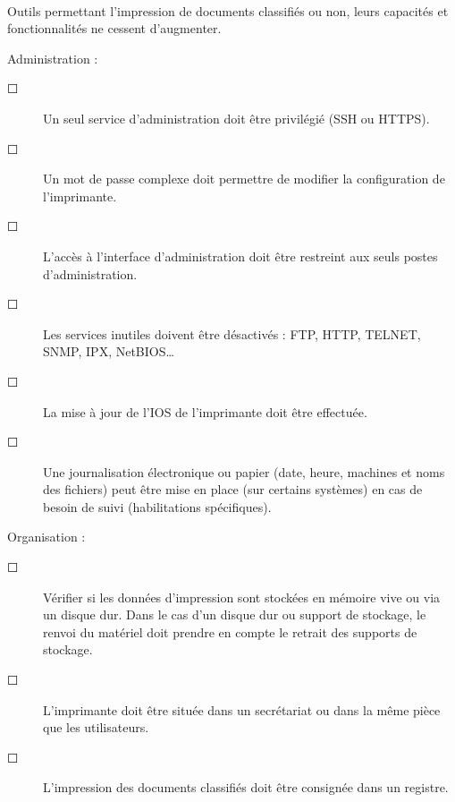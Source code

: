 \documentclass[a4paper,11pt]{article}				    %
\begin{document}
{
\\Outils permettant l'impression de documents classifi\'es ou non, leurs capacit\'es et fonctionnalit\'es ne cessent d'augmenter.
}
{
\begin{LARGE}Administration : \end{LARGE}
\begin{description}
    \item[$\Square$] Un seul service d'administration doit \^etre privil\'egi\'e (SSH ou HTTPS).
    \item[$\Square$] Un mot de passe complexe doit permettre de modifier la configuration de l'imprimante.
    \item[$\Square$] L'acc\`es \`a l'interface d'administration doit \^etre restreint aux seuls postes d'administration.
    \item[$\Square$] Les services inutiles doivent \^etre d\'esactiv\'es : FTP, HTTP, TELNET, SNMP, IPX, NetBIOS\dots{}
    \item[$\Square$] La mise \`a jour de l'IOS de l'imprimante doit \^etre effectu\'ee.
    \item[$\Square$] Une journalisation \'electronique ou papier (date, heure, machines et noms des fichiers) peut \^etre mise en place (sur certains syst\`emes) en cas de besoin de suivi (habilitations sp\'ecifiques).\\
\end{description}

\begin{LARGE}Organisation : \end{LARGE}
\begin{description}
    \item[$\Square$] V\'erifier si les donn\'ees d'impression sont stock\'ees en m\'emoire vive ou via un disque dur. Dans le cas d'un disque dur ou support de stockage, le renvoi du mat\'eriel doit prendre en compte le retrait des supports de stockage.
    \item[$\Square$] L'imprimante doit \^etre situ\'ee dans un secr\'etariat ou dans la m\^eme pi\`ece que les utilisateurs.
    \item[$\Square$] L'impression des documents classifi\'es doit \^etre consign\'ee dans un registre. 
\end{description}
}
\end{document}
